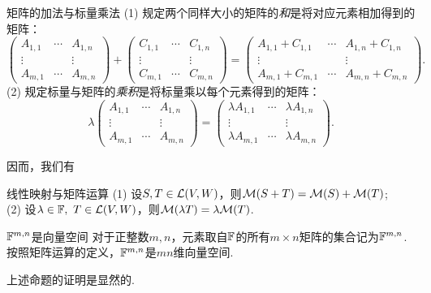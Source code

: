 \begin{definition}{矩阵的加法与标量乘法}
	(1) 规定两个同样大小的矩阵的\textit{和}是将对应元素相加得到的矩阵：$$\begin{pmatrix}
		A_{1,1} & \cdots & A_{1,n} \\
		\vdots &  & \vdots \\
		A_{m,1} & \cdots & A_{m,n}
	\end{pmatrix} + \begin{pmatrix}
		C_{1,1} & \cdots & C_{1,n} \\
		\vdots &  & \vdots \\
		C_{m,1} & \cdots & C_{m,n}
	\end{pmatrix} = \begin{pmatrix}
		A_{1,1}+C_{1,1} & \cdots & A_{1,n}+C_{1,n} \\
		\vdots &  & \vdots \\
		A_{m,1}+C_{m,1} & \cdots & A_{m,n}+C_{m,n}
	\end{pmatrix}.$$
	(2) 规定标量与矩阵的\textit{乘积}是将标量乘以每个元素得到的矩阵：$$\lambda \begin{pmatrix}
		A_{1,1} & \cdots & A_{1,n} \\
		\vdots &  & \vdots \\
		A_{m,1} & \cdots & A_{m,n}
	\end{pmatrix} = \begin{pmatrix}
		\lambda A_{1,1} & \cdots & \lambda A_{1,n} \\
		\vdots &  & \vdots \\
		\lambda A_{m,1} & \cdots & \lambda A_{m,n}
	\end{pmatrix}.$$
\end{definition}

因而，我们有

\begin{proposition}{线性映射与矩阵运算}\label{pro:xmxkykueyysrjuvf}
	(1) 设$S,T \in \mathcal{L} (V,W)$，则$\mathcal{M} (S+T)=\mathcal{M} (S) + \mathcal{M} (T)$; \\
	(2) 设$\lambda \in \mathbb{F} ,~T \in \mathcal{L} (V,W)$，则$\mathcal{M} (\lambda T) = \lambda \mathcal{M} (T)$. 
\end{proposition}

\begin{proposition}{$\mathbb{F} ^{m,n}$是向量空间}
	对于正整数$m,n$，元素取自$\mathbb{F}$的所有$m \times n$矩阵的集合记为$\mathbb{F} ^{m,n}$.按照矩阵运算的定义，$\mathbb{F} ^{m,n}$是$mn$维向量空间.
\end{proposition}

上述命题的证明是显然的.

